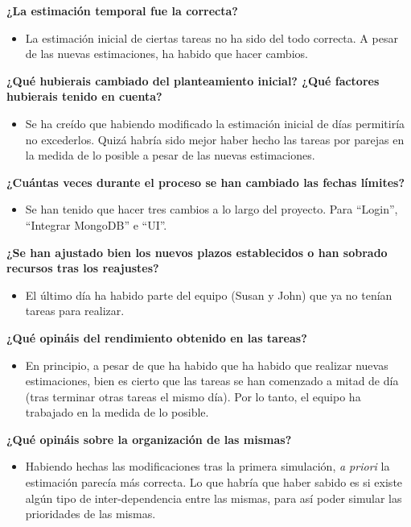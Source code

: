 \documentclass{\ClassPath/viu-tfm-template}
\begin{document}
\textbf{¿La estimación temporal fue la correcta?}
\vspace{-12pt}
\begin{itemize}
    \item La estimación inicial de ciertas tareas no ha sido del todo correcta. A pesar de las nuevas estimaciones, ha habido que hacer cambios.
\end{itemize}

\textbf{¿Qué hubierais cambiado del planteamiento inicial? ¿Qué factores hubierais tenido en cuenta?}
\vspace{-12pt}
\begin{itemize}
    \item Se ha creído que habiendo modificado la estimación inicial de días permitiría no excederlos. Quizá habría sido mejor haber hecho las tareas por parejas en la medida de lo posible a pesar de las nuevas estimaciones.
\end{itemize}

\textbf{¿Cuántas veces durante el proceso se han cambiado las fechas límites?}
\vspace{-12pt}
\begin{itemize}
    \item Se han tenido que hacer tres cambios a lo largo del proyecto. Para “Login”, “Integrar MongoDB” e “UI”.
\end{itemize}


\textbf{¿Se han ajustado bien los nuevos plazos establecidos o han sobrado recursos tras los reajustes?}
\vspace{-12pt}
\begin{itemize}
    \item El último día ha habido parte del equipo (Susan y John) que ya no tenían tareas para realizar.
\end{itemize}


\textbf{¿Qué opináis del rendimiento obtenido en las tareas?}
\vspace{-12pt}
\begin{itemize}
    \item En principio, a pesar de que ha habido que ha habido que realizar nuevas estimaciones, bien es cierto que las tareas se han comenzado a mitad de día (tras terminar otras tareas el mismo día). Por lo tanto, el equipo ha trabajado en la medida de lo posible.
\end{itemize}

\textbf{¿Qué opináis sobre la organización de las mismas?}
\vspace{-12pt}
\begin{itemize}
    \item Habiendo hechas las modificaciones tras la primera simulación, \textit{a priori} la estimación parecía más correcta. Lo que habría que haber sabido es si existe algún tipo de inter-dependencia entre las mismas, para así poder simular las prioridades de las mismas.
\end{itemize}
\end{document}
